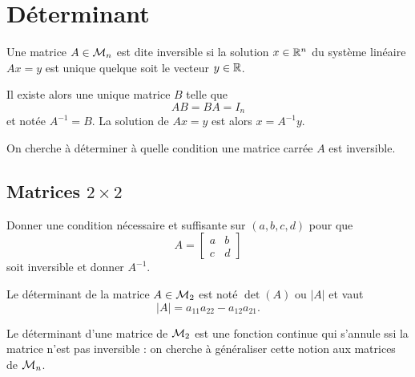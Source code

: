 \section{Déterminant} \label{sec:LinAlg-Det}

\begin{definition*}
  Une matrice $A \in \mathcal{M}_n$ est dite inversible si la solution $x \in \mathbb{R}^n$ du système linéaire $A x = y$ est unique quelque soit le vecteur $y \in \mathbb{R}$.
\end{definition*}

Il existe alors une unique matrice $B$ telle que 
$$
AB = BA = I_n
$$
et notée $A^{-1} = B$. La solution de $Ax = y$ est alors $x = A^{-1} y$.

On cherche à déterminer à quelle condition une matrice carrée $A$ est inversible.

\subsection{Matrices $2 \times 2$} 

\begin{exercise*}
  Donner une condition nécessaire et suffisante sur $(a, b, c, d)$ pour que 
  $$
  A = \left[\begin{array}{cc} a & b \\ c & d \end{array} \right]
  $$
  soit inversible et donner $A^{-1}$.
\end{exercise*}


\begin{definition*}
  Le déterminant de la matrice $A \in \mathcal{M}_2$ est noté $\det(A)$ ou $|A|$ et vaut
  $$
  |A| = a_{11} a_{22} - a_{12} a_{21}.
  $$
\end{definition*}

Le déterminant d'une matrice de $\mathcal{M}_2$ est une fonction continue qui s'annule ssi la matrice n'est pas inversible : on cherche à généraliser cette notion aux matrices de $\mathcal{M}_n$.

